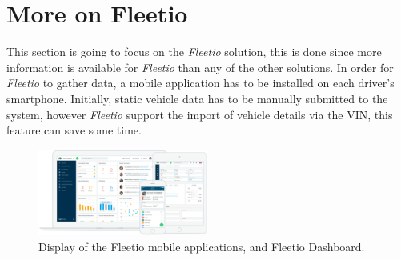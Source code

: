 \section{More on Fleetio}
This section is going to focus on the \textit{Fleetio} solution, this is done since more information is available for \textit{Fleetio} than any of the other solutions.
In order for \textit{Fleetio} to gather data, a mobile application has to be installed on each driver's smartphone.
Initially, static vehicle data has to be manually submitted to the system, however \textit{Fleetio} support the import of vehicle details via the \ac{VIN}, this feature can save some time.

\begin{figure}[h!]
    \centering
    \includegraphics[width=0.5\textwidth]{img/fleetio.png}
    \caption{Display of the Fleetio mobile applications, and Fleetio Dashboard.}
    \label{fig:Fleetio_Devices}
\end{figure}

